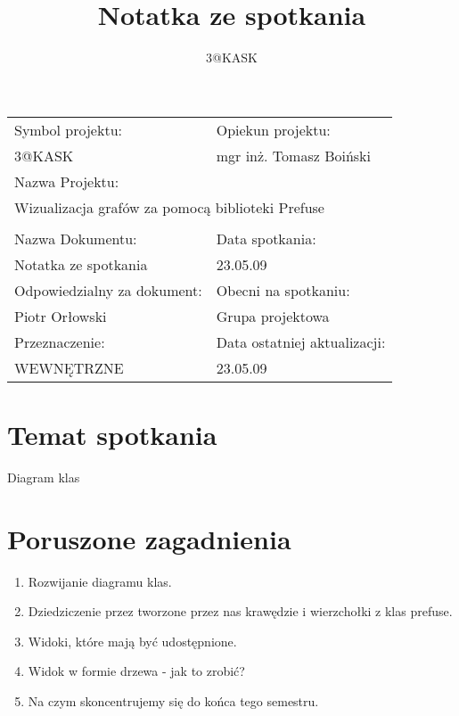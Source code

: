 \documentclass[a4paper,10pt]{article}
\title{Notatka ze spotkania}
\author{3@KASK}
\begin{document}



\maketitle


\begin{center}
\begin{tabular}{|p{7cm}|p{7cm}|}
\hline
Symbol projektu: & Opiekun projektu:   \tabularnewline 
3@KASK & mgr inż. Tomasz Boiński    \tabularnewline \hline
\multicolumn{2}{|l|}{Nazwa Projektu: } \tabularnewline
\multicolumn{2}{|l|}{Wizualizacja grafów za pomocą biblioteki Prefuse } \tabularnewline 
\hline
\multicolumn{2}{l}{ } \tabularnewline %
\hline 
Nazwa Dokumentu: & Data spotkania:   \tabularnewline 
Notatka ze spotkania & 23.05.09 \tabularnewline \hline
Odpowiedzialny za dokument: & Obecni na spotkaniu:   \tabularnewline 
Piotr Orłowski & Grupa projektowa \tabularnewline \hline
Przeznaczenie: & Data ostatniej aktualizacji:   \tabularnewline 
WEWNĘTRZNE & 23.05.09 \tabularnewline \hline
\end{tabular}
\end{center}



\section{Temat spotkania}
Diagram klas

\section{Poruszone zagadnienia}
\begin{enumerate}
\item Rozwijanie diagramu klas.
\item Dziedziczenie przez tworzone przez nas krawędzie i wierzchołki z klas prefuse.
\item Widoki, które mają być udostępnione.
\item Widok w formie drzewa - jak to zrobić? 
\item Na czym skoncentrujemy się do końca tego semestru.
\end{enumerate}
\end{document}

